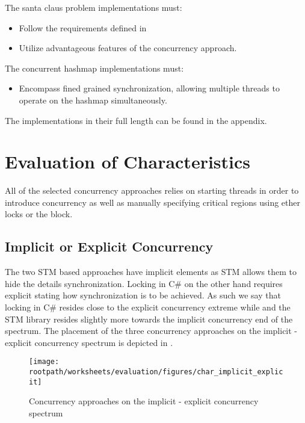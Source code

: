 The santa claus problem implementations must:
\begin{itemize}
	\item Follow the requirements defined in \cite{trono1994new}
	\item Utilize advantageous features of the concurrency approach.
\end{itemize}

The concurrent hashmap implementations must:
\begin{itemize}
	\item Encompass fined grained synchronization, allowing multiple threads to operate on the hashmap simultaneously.
\end{itemize}
The implementations in their full length can be found in the appendix.

\section{Evaluation of Characteristics}
All of the selected concurrency approaches relies on starting threads in order to introduce concurrency as well as manually specifying critical regions using ether locks or the  block. 
\subsection{Implicit or Explicit Concurrency}
The two \ac{STM} based approaches have implicit elements as \ac{STM} allows them to hide the details synchronization. Locking in C\# on the other hand requires explicit stating how synchronization is to be achieved. As such we say that locking in C\# resides close to the explicit concurrency extreme while \stmnamesp and the \ac{STM} library resides slightly more towards the implicit concurrency end of the spectrum. The placement of the three concurrency approaches on the implicit - explicit concurrency spectrum is depicted in .

\begin{figure}[htbp]
\centering
 \texttt{[image: \\rootpath/worksheets/evaluation/figures/char\_implicit\_explicit]} 
 \caption{Concurrency approaches on the implicit - explicit concurrency spectrum}
\label{fig:char_implicit_explicit}
\end{figure}

